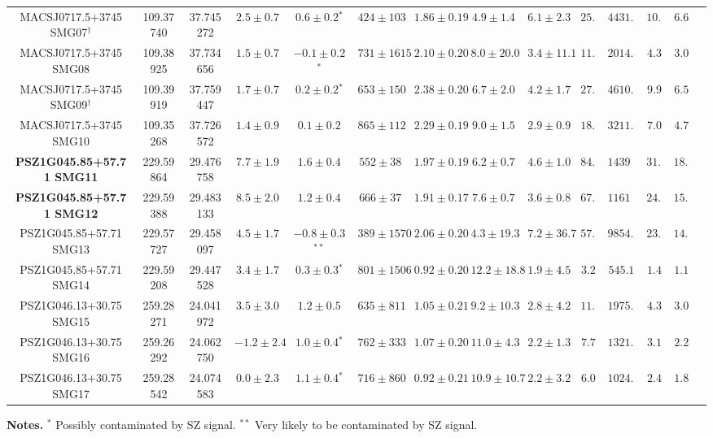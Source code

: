 \documentclass[11pt,a4paper,twoside,graphicx,color]{article}
\begin{document}
\begin{table}[h]
\begin{center}
{\begin{tabular}{c|cccc|ccccccccc}
\hline
MACSJ0717.5+3745 SMG07$^{\dagger}$ & 109.37740 & 37.745272 & $2.5 \pm 0.7$ & $0.6 \pm 0.2$$^{*}$ & $424 \pm 103$ & $1.86 \pm 0.19$ & $4.9 \pm 1.4$ & $6.1 \pm 2.3$ & $25.9$ & $4431.6$ & $10.1$ & $6.6$ \\
MACSJ0717.5+3745 SMG08 & 109.38925 & 37.734656 & $1.5 \pm 0.7$ & $-0.1 \pm 0.2$$^{*}$ & $731 \pm 1615$ & $2.10 \pm 0.20$ & $8.0 \pm 20.0$ & $3.4 \pm 11.1$ & $11.8$ & $2014.6$ & $4.3$ & $3.0$ \\
MACSJ0717.5+3745 SMG09$^{\dagger}$ & 109.39919 & 37.759447 & $1.7 \pm 0.7$ & $0.2 \pm 0.2$$^{*}$ & $653 \pm 150$ & $2.38 \pm 0.20$ & $6.7 \pm 2.0$ & $4.2 \pm 1.7$ & $27.0$ & $4610.0$ & $9.9$ & $6.5$ \\
MACSJ0717.5+3745 SMG10 & 109.35268 & 37.726572 & $1.4 \pm 0.9$ & $0.1 \pm 0.2$ & $865 \pm 112$ & $2.29 \pm 0.19$ & $9.0 \pm 1.5$ & $2.9 \pm 0.9$ & $18.8$ & $3211.5$ & $7.0$ & $4.7$ \\
\hline
{\bf PSZ1G045.85+57.71 SMG11} & 229.59864 & 29.476758 & $7.7 \pm 1.9$ & $1.6 \pm 0.4$ & $552 \pm 38$ & $1.97 \pm 0.19$ & $6.2 \pm 0.7$ & $4.6 \pm 1.0$ & $84.2$ & $14392.5$ & $31.0$ & $18.7$ \\
{\bf PSZ1G045.85+57.71 SMG12} & 229.59388 & 29.483133 & $8.5 \pm 2.0$ & $1.2 \pm 0.4$ & $666 \pm 37$ & $1.91 \pm 0.17$ & $7.6 \pm 0.7$ & $3.6 \pm 0.8$ & $67.9$ & $11615.2$ & $24.8$ & $15.2$ \\
PSZ1G045.85+57.71 SMG13 & 229.57727 & 29.458097 & $4.5 \pm 1.7$ & $-0.8 \pm 0.3$$^{**}$ & $389 \pm 1570$ & $2.06 \pm 0.20$ & $4.3 \pm 19.3$ & $7.2 \pm 36.7$ & $57.6$ & $9854.6$ & $23.4$ & $14.5$ \\
PSZ1G045.85+57.71 SMG14 & 229.59208 & 29.447528 & $3.4 \pm 1.7$ & $0.3 \pm 0.3$$^{*}$ & $801 \pm 1506$ & $0.92 \pm 0.20$ & $12.2 \pm 18.8$ & $1.9 \pm 4.5$ & $3.2$ & $545.1$ & $1.4$ & $1.1$ \\
\hline
PSZ1G046.13+30.75 SMG15 & 259.28271 & 24.041972 & $3.5 \pm 3.0$ & $1.2 \pm 0.5$ & $635 \pm 811$ & $1.05 \pm 0.21$ & $9.2 \pm 10.3$ & $2.8 \pm 4.2$ & $11.6$ & $1975.9$ & $4.3$ & $3.0$ \\
PSZ1G046.13+30.75 SMG16 & 259.26292 & 24.062750 & $-1.2 \pm 2.4$ & $1.0 \pm 0.4$$^{*}$ & $762 \pm 333$ & $1.07 \pm 0.20$ & $11.0 \pm 4.3$ & $2.2 \pm 1.3$ & $7.7$ & $1321.8$ & $3.1$ & $2.2$ \\
PSZ1G046.13+30.75 SMG17 & 259.28542 & 24.074583 & $0.0 \pm 2.3$ & $1.1 \pm 0.4$$^{*}$ & $716 \pm 860$ & $0.92 \pm 0.21$ & $10.9 \pm 10.7$ & $2.2 \pm 3.2$ & $6.0$ & $1024.2$ & $2.4$ & $1.8$ \\
\hline
\end{tabular}
}
\end{center}
{\small {\bf Notes.} $^{*}$ Possibly contaminated by SZ signal. $^{**}$ Very likely to be contaminated by SZ signal.}
\label{tab:candidate_summary}
\end{table}
\end{document}
